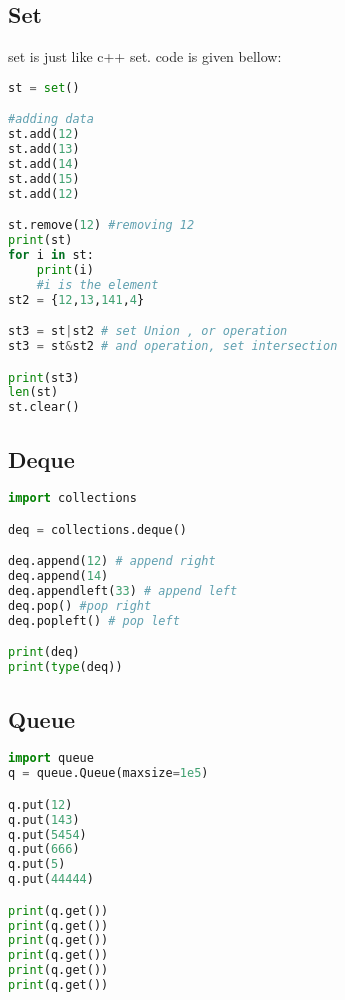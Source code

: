\documentclass[12pt]{article}
\begin{document}
\subsection{Set}
set is just like c++ set. code is given bellow: 
\begin{lstlisting}[language=Python,tabsize=3]
st = set()

#adding data 
st.add(12)
st.add(13)
st.add(14)
st.add(15)
st.add(12)

st.remove(12) #removing 12
print(st)
for i in st:
	print(i)
	#i is the element
st2 = {12,13,141,4}

st3 = st|st2 # set Union , or operation
st3 = st&st2 # and operation, set intersection

print(st3)
len(st)
st.clear()
\end{lstlisting}
\subsection{Deque}
\begin{lstlisting}[language=Python,tabsize=3]
import collections 

deq = collections.deque()

deq.append(12) # append right
deq.append(14)
deq.appendleft(33) # append left
deq.pop() #pop right
deq.popleft() # pop left

print(deq)
print(type(deq))
\end{lstlisting}

\subsection{Queue}
\begin{lstlisting}[language=Python,tabsize=3]
import queue
q = queue.Queue(maxsize=1e5)

q.put(12)
q.put(143) 
q.put(5454) 
q.put(666) 
q.put(5) 
q.put(44444) 

print(q.get())
print(q.get())
print(q.get())
print(q.get())
print(q.get())
print(q.get())

\end{lstlisting}
\end{document}
